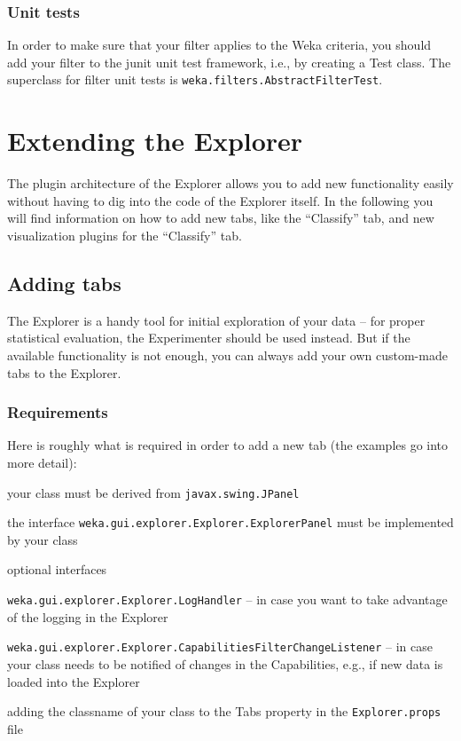 \subsubsection{Unit tests}
In order to make sure that your filter applies to the Weka criteria, you
should add your filter to the junit unit test framework, i.e., by creating a
Test class. The superclass for filter unit tests is
\texttt{weka.filters.AbstractFilterTest}.


\newpage
\section{Extending the Explorer}
The plugin architecture of the Explorer allows you to add new functionality
easily without having to dig into the code of the Explorer itself. In the
following you will find information on how to add new tabs, like the
``Classify'' tab, and new visualization plugins for the ``Classify'' tab.

\subsection{Adding tabs}
The Explorer is a handy tool for initial exploration of your data -- for
proper statistical evaluation, the Experimenter should be used instead. But if
the available functionality is not enough, you can always add your own
custom-made tabs to the Explorer.

\subsubsection{Requirements}
Here is roughly what is required in order to add a new tab (the examples go into
more detail):
\begin{tight_itemize}
  \item your class must be derived from \texttt{javax.swing.JPanel}
  \item the interface \texttt{weka.gui.explorer.Explorer.ExplorerPanel} must be
implemented by your class
  \item optional interfaces
  \begin{tight_itemize}
	\item \texttt{weka.gui.explorer.Explorer.LogHandler} -- in case
you want to take advantage of the logging in the Explorer
	\item \texttt{weka.gui.explorer.Explorer.CapabilitiesFilterChangeListener}
-- in case your class needs to be notified of changes in the
Capabilities, e.g., if new data is loaded into the Explorer
  \end{tight_itemize}
  \item adding the classname of your class to the Tabs property in the
\texttt{Explorer.props} file
\end{tight_itemize}

